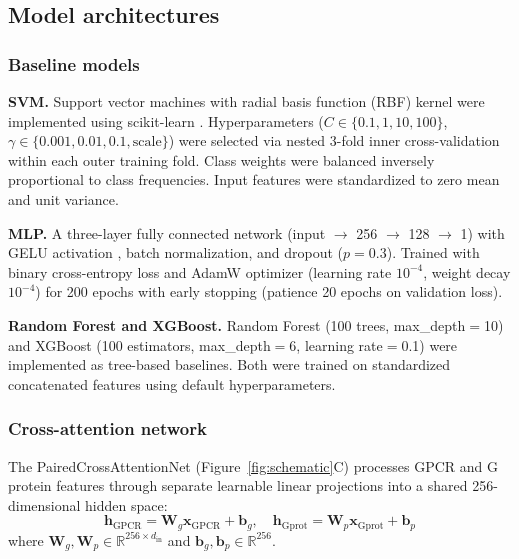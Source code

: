 \documentclass[11pt,a4paper]{article}
\begin{document}
\subsection{Model architectures}

\subsubsection{Baseline models}

\textbf{SVM.} Support vector machines with radial basis function (RBF) kernel were implemented using scikit-learn \cite{pedregosa2011scikit}. Hyperparameters ($C \in \{0.1, 1, 10, 100\}$, $\gamma \in \{0.001, 0.01, 0.1, \text{scale}\}$) were selected via nested 3-fold inner cross-validation within each outer training fold. Class weights were balanced inversely proportional to class frequencies. Input features were standardized to zero mean and unit variance.

\textbf{MLP.} A three-layer fully connected network (input $\rightarrow$ 256 $\rightarrow$ 128 $\rightarrow$ 1) with GELU activation \cite{hendrycks2016gaussian}, batch normalization, and dropout ($p=0.3$). Trained with binary cross-entropy loss and AdamW optimizer \cite{loshchilov2019decoupled} (learning rate $10^{-4}$, weight decay $10^{-4}$) for 200 epochs with early stopping (patience 20 epochs on validation loss).

\textbf{Random Forest and XGBoost.} Random Forest (100 trees, max\_depth$=$10) and XGBoost \cite{chen2016xgboost} (100 estimators, max\_depth$=$6, learning rate$=$0.1) were implemented as tree-based baselines. Both were trained on standardized concatenated features using default hyperparameters.

\subsubsection{Cross-attention network}

The PairedCrossAttentionNet (Figure~\ref{fig:schematic}C) processes GPCR and G protein features through separate learnable linear projections into a shared 256-dimensional hidden space:
\begin{equation}
\mathbf{h}_{\text{GPCR}} = \mathbf{W}_g \mathbf{x}_{\text{GPCR}} + \mathbf{b}_g, \quad
\mathbf{h}_{\text{Gprot}} = \mathbf{W}_p \mathbf{x}_{\text{Gprot}} + \mathbf{b}_p
\end{equation}
where $\mathbf{W}_g, \mathbf{W}_p \in \mathbb{R}^{256 \times d_{\text{in}}}$ and $\mathbf{b}_g, \mathbf{b}_p \in \mathbb{R}^{256}$.
\end{document}
